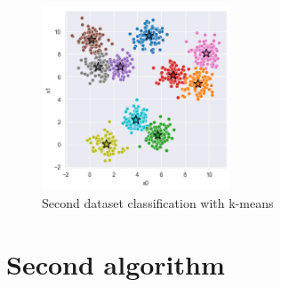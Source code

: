 \documentclass{article}
\begin{document}
\begin{figure}[h]
    \centering
    \includegraphics[width=0.5\textwidth]{kmeans_data2.png}
    \caption{Second dataset classification with k-means}
    \label{fig:dataset2}
\end{figure}


\section{Second algorithm}
\end{document}
